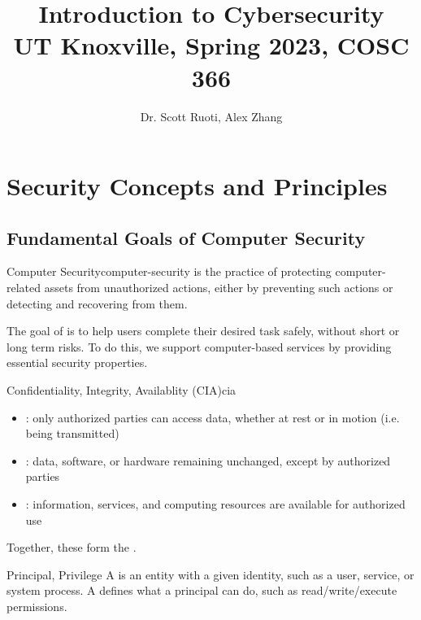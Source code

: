 \documentclass[code]{amznotes}
\title{\textbf{Introduction to Cybersecurity}\\
\large UT Knoxville, Spring 2023, COSC 366}
\author{Dr. Scott Ruoti, Alex Zhang}
\begin{document}
\maketitle
\tableofcontents

\chapter{Security Concepts and Principles}

\section{Fundamental Goals of Computer Security}

\begin{dfnbox}{Computer Security}{computer-security}
     is the practice of protecting computer-related assets from unauthorized actions, either by preventing such actions or detecting and recovering from them.
\end{dfnbox}

The goal of  is to help users complete their desired task safely, without short or long term risks.  To do this, we support computer-based services by providing essential security properties.

\begin{dfnbox}{Confidentiality, Integrity, Availablity (CIA)}{cia}
    \begin{itemize}[noitemsep]
        \item {}: only authorized parties can access data, whether at rest or in motion (i.e. being transmitted)
        \item {}: data, software, or hardware remaining unchanged, except by authorized parties
        \item {}: information, services, and computing resources are available for authorized use
    \end{itemize}
    Together, these form the .
\end{dfnbox}

\begin{dfnbox}{Principal, Privilege}{}
    A  is an entity with a given identity, such as a user, service, or system process. A  defines what a principal can do, such as read/write/execute permissions.
\end{dfnbox}
\end{document}
